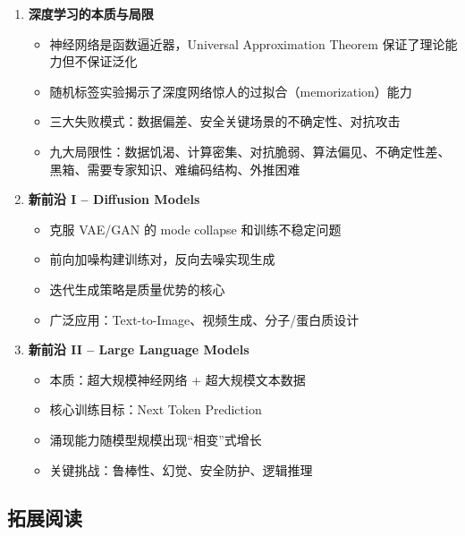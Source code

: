 \documentclass[a4paper]{article}
\begin{document}
\begin{enumerate}
    \item \textbf{深度学习的本质与局限}
    \begin{itemize}
        \item 神经网络是函数逼近器，Universal Approximation Theorem 保证了理论能力但不保证泛化
        \item 随机标签实验揭示了深度网络惊人的过拟合（memorization）能力
        \item 三大失败模式：数据偏差、安全关键场景的不确定性、对抗攻击
        \item 九大局限性：数据饥渴、计算密集、对抗脆弱、算法偏见、不确定性差、黑箱、需要专家知识、难编码结构、外推困难
    \end{itemize}

    \item \textbf{新前沿 I -- Diffusion Models}
    \begin{itemize}
        \item 克服 VAE/GAN 的 mode collapse 和训练不稳定问题
        \item 前向加噪构建训练对，反向去噪实现生成
        \item 迭代生成策略是质量优势的核心
        \item 广泛应用：Text-to-Image、视频生成、分子/蛋白质设计
    \end{itemize}

    \item \textbf{新前沿 II -- Large Language Models}
    \begin{itemize}
        \item 本质：超大规模神经网络 + 超大规模文本数据
        \item 核心训练目标：Next Token Prediction
        \item 涌现能力随模型规模出现``相变''式增长
        \item 关键挑战：鲁棒性、幻觉、安全防护、逻辑推理
    \end{itemize}
\end{enumerate}

\subsection{拓展阅读}
\end{document}
